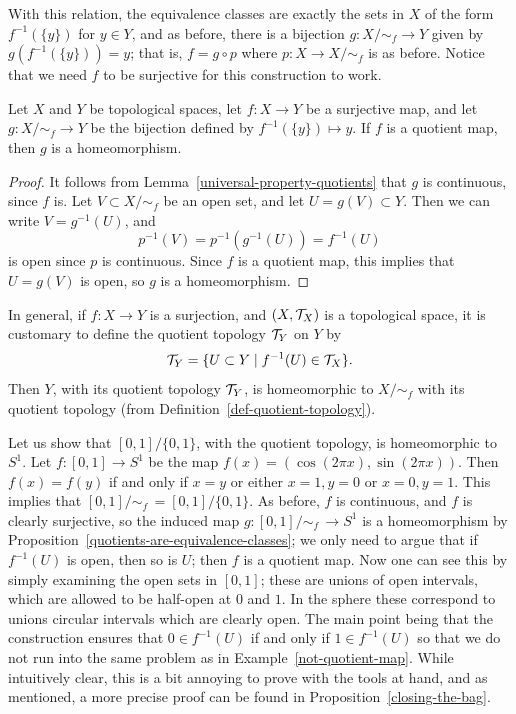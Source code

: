 With this relation, the equivalence classes are exactly the sets in $X$ of the form $f^{-1}(\{y\})$ for $y \in Y$, and as before, there is a bijection $g: X/\!\sim_f \to Y$ given by $g(f^{-1}(\{y\})) = y$; that is, $f = g \circ p$ where $p : X \to X/\!\sim_f$ is as before. Notice that we need $f$ to be surjective for this construction to work.
\begin{prop}
  \label{quotients-are-equivalence-classes}
  Let $X$ and $Y$ be topological spaces, let $f : X \to Y$ be a surjective map, and let $g : X/ \!\sim_f \to Y$ be the bijection defined by $f^{-1}(\{y\}) \mapsto y$. If $f$ is a quotient map, then $g$ is a homeomorphism.
\end{prop}
\begin{proof}
  It follows from Lemma~\ref{universal-property-quotients} that $g$ is continuous, since $f$ is. Let $V \subset X/\!\sim_f$ be an open set, and let $U = g(V) \subset Y$. Then we can write $V = g^{-1}(U)$, and
  \[
    p^{-1}(V) = p^{-1}(g^{-1}(U)) = f^{-1}(U)
  \]
  is open since $p$ is continuous. Since $f$ is a quotient map, this implies that $U = g(V)$ is open, so $g$ is a homeomorphism.
\end{proof}
\begin{rem}
  In general, if $f : X \to Y$ is a surjection, and $(X,\mathcal{T}_X)$ is a topological space, it is customary to define the quotient topology $\mathcal{T}_Y$ on $Y$ by
  \[
    \mathcal{T}_Y = \{ U \subset Y \mid f^{-1}(U) \in \mathcal{T}_X \}.
  \]
  Then $Y$, with its quotient topology $\mathcal{T}_Y$, is homeomorphic to $X/\!\sim_f$ with its quotient topology (from Definition~\ref{def-quotient-topology}).
\end{rem}
\begin{example}
  \label{circle-from-interval}
  Let us show that $[0,1]/\{0,1\}$, with the quotient topology, is homeomorphic to $S^1$. Let $f : [0,1] \to S^1$ be the map $f(x) = (\cos(2\pi x), \sin(2\pi x))$. Then $f(x) = f(y)$ if and only if $x = y$ or either $x=1,y=0$ or $x=0,y=1$. This implies that $[0,1]/\!\sim_f\, = [0,1]/\{0,1\}$. As before, $f$ is continuous, and $f$ is clearly surjective, so the induced map $g : [0,1]/\!\sim_f \,\to S^1$ is a homeomorphism by Proposition~\ref{quotients-are-equivalence-classes}; we only need to argue that if $f^{-1}(U)$ is open, then so is $U$; then $f$ is a quotient map. Now one can see this by simply examining the open sets in $[0,1]$; these are unions of open intervals, which are allowed to be half-open at $0$ and $1$. In the sphere these correspond to unions circular intervals which are clearly open. The main point being that the construction ensures that $0 \in f^{-1}(U)$ if and only if $1 \in f^{-1}(U)$ so that we do not run into the same problem as in Example~\ref{not-quotient-map}. While intuitively clear, this is a bit annoying to prove with the tools at hand, and as mentioned, a more precise proof can be found in Proposition~\ref{closing-the-bag}.
\end{example}
